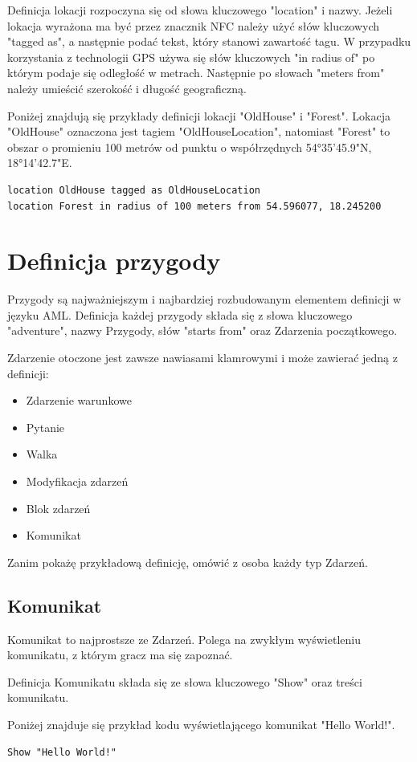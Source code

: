 \documentclass	{xmgr}
\begin{document}
Definicja lokacji rozpoczyna się od słowa kluczowego "location" i nazwy. Jeżeli lokacja wyrażona ma być przez znacznik NFC należy użyć słów kluczowych "tagged as", a następnie podać tekst, który stanowi zawartość tagu. W przypadku korzystania z technologii GPS używa się słów kluczowych "in radius of" po którym podaje się odległość w metrach. Następnie po słowach "meters from" należy umieścić szerokość i długość geograficzną.

Poniżej znajdują się przykłady definicji lokacji "OldHouse" i "Forest". Lokacja "OldHouse" oznaczona jest tagiem "OldHouseLocation", natomiast 
"Forest" to obszar o promieniu 100 metrów od punktu o współrzędnych 54°35'45.9"N, 18°14'42.7"E.
\begin{lstlisting}
location OldHouse tagged as OldHouseLocation
location Forest in radius of 100 meters from 54.596077, 18.245200
\end{lstlisting}


\section{Definicja przygody}
Przygody są najważniejszym i najbardziej rozbudowanym elementem definicji w języku AML. 
Definicja każdej przygody składa się z słowa kluczowego "adventure", nazwy Przygody, słów "starts from" oraz Zdarzenia początkowego.

Zdarzenie otoczone jest zawsze nawiasami klamrowymi i może zawierać jedną z definicji:
\begin{itemize}
	\item Zdarzenie warunkowe
	\item Pytanie
	\item Walka
	\item Modyfikacja zdarzeń
	\item Blok zdarzeń
	\item Komunikat
\end{itemize}

Zanim pokażę przykładową definicję, omówić z osoba każdy typ Zdarzeń.
\subsection*{Komunikat}
Komunikat to najprostsze ze Zdarzeń. Polega na zwykłym wyświetleniu komunikatu, z którym gracz ma się zapoznać.

Definicja Komunikatu składa się ze słowa kluczowego "Show" oraz treści komunikatu.

Poniżej znajduje się przykład kodu wyświetlającego komunikat "Hello World!".
\begin{lstlisting}
Show "Hello World!"
\end{lstlisting}
\end{document}
